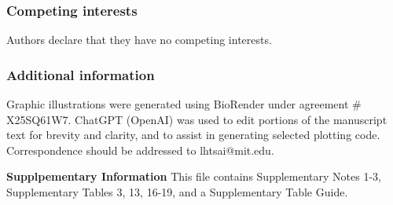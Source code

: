 \subsubsection{Competing interests}
Authors declare that they have no competing interests.

\subsubsection{Additional information}
Graphic illustrations were generated using BioRender under agreement \# X25SQ61W7. ChatGPT (OpenAI) was used to edit portions of the manuscript text for brevity and clarity, and to assist in generating selected plotting code. 
Correspondence should be addressed to lhtsai@mit.edu.

\textbf{Supplpementary Information}\newline\newline
This file contains Supplementary Notes 1-3, Supplementary Tables 3, 13, 16-19, and a Supplementary Table Guide.

